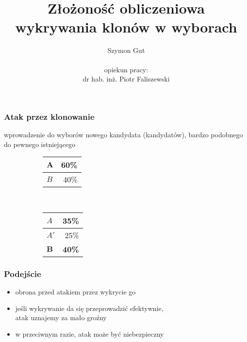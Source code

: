 \documentclass{beamer}
\begin{document}
	
\title[Złożoność obliczeniowa wykrywania klonów w wyborach]{Złożoność obliczeniowa\\ wykrywania klonów w wyborach}
\author[Szymon Gut]{Szymon Gut\\ \hfill \\opiekun pracy:\\dr hab. inż. Piotr Faliszewski}
\date{}
\frame{\titlepage}



\begin{frame} \frametitle{Atak przez klonowanie}
	wprowadzenie do wyborów nowego kandydata (kandydatów), bardzo podobnego do pewnego istniejącego
	
	\vfill

	\begin{center}
	\begin{figure}
        \centering
        \begin{subfigure}[b]{0.3\textwidth}
			\begin{tabular}{ | l |  r | } \hline
  				$\mathbf{A}$ & \textbf{60\%} \\ \hline
  				$B$ & 40\% \\ \hline
			\end{tabular}
        \end{subfigure}
        ~ %
        \begin{subfigure}[b]{0.1\textwidth}
        	\MVRightarrow
        \end{subfigure}
        \begin{subfigure}[b]{0.3\textwidth}
			\begin{tabular}{ | l |  r | } \hline
  				$A$ & 35\% \\ \hline
  				$A'$ & 25\% \\ \hline
  				$\mathbf{B}$ & \textbf{40\%} \\ \hline
			\end{tabular}
        \end{subfigure}
	\end{figure}
	\end{center}
\end{frame}

\begin{frame} \frametitle{Podejście}
	\begin{itemize}
		\item obrona przed atakiem przez wykrycie go
										
		\vfill
		\item jeśli wykrywanie da się przeprowadzić efektywnie,\\
				 atak uznajemy za mało groźny
		\item w przeciwnym razie, atak może być niebezpieczny
	\end{itemize}
\end{frame}
\end{document}
